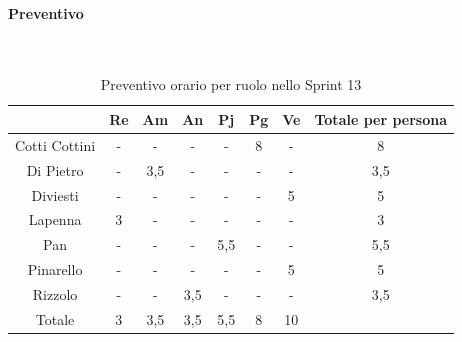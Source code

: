 \documentclass{article}
\begin{document}
                \paragraph{Preventivo}\mbox{}\\
                \begin{table}[H]
                    \centering
                    \begin{tabular}{|c|c|c|c|c|c|c|c|}
                    \hline
                                  & Re  & Am  & An  & Pj  & Pg  & Ve  & Totale per persona \\ \hline
                    Cotti Cottini & -   & -   & -   & -   & 8  & -   & 8                 \\ \hline
                    Di Pietro     & -   & 3,5 & -   & -   & -   & -   & 3,5                \\ \hline
                    Diviesti      & -   & -   & -   & -   & -   & 5   & 5                  \\ \hline
                    Lapenna       & 3   & -   & -   & -   & -   & -   & 3                  \\ \hline
                    Pan           & -   & -   & -   & 5,5 & -   & -   & 5,5                \\ \hline
                    Pinarello     & -   & -   & -   & -   & -   & 5   & 5                  \\ \hline
                    Rizzolo       & -   & -   & 3,5 & -   & -   & -   & 3,5                \\ \hline
                    Totale        & 3   & 3,5 & 3,5 & 5,5 & 8  & 10  &                    \\ \hline
                    \end{tabular}
                    \caption{Preventivo orario per ruolo nello Sprint 13}
                \end{table}

\end{document}
